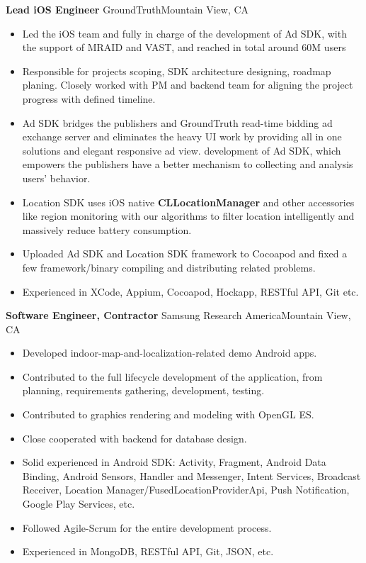\documentclass[10pt,letterpaper,sans]{moderncv}        %
\begin{document}
\vspace*{0.5cm}
{\textbf{Lead iOS Engineer}}
{GroundTruth}{Mountain View, CA}{}{
\begin{itemize}
\item Led the iOS team and fully in charge of the development of Ad SDK, with the support of MRAID and VAST, and reached in total around 60M users
\item Responsible for projects scoping, SDK architecture designing, roadmap planing. Closely worked with PM and backend team for aligning the project progress with defined timeline. 
\item Ad SDK bridges the publishers and GroundTruth read-time bidding ad exchange server and eliminates the heavy UI work by providing all in one solutions and elegant responsive ad view.
development of Ad SDK, which empowers the publishers have a better mechanism to collecting and analysis users' behavior.
\item Location SDK uses iOS native \textbf{CLLocationManager} and other accessories like region monitoring with our algorithms to filter location intelligently and massively reduce battery consumption.
\item Uploaded Ad SDK and Location SDK framework to Cocoapod and fixed a few framework/binary compiling and distributing related problems.
\item Experienced in XCode, Appium, Cocoapod, Hockapp, RESTful API, Git etc.
\end{itemize}} 

\vspace*{0.5cm}
{\textbf{Software Engineer, Contractor}}
{Samsung Research America}{Mountain View, CA}{}{
\begin{itemize}
\item Developed indoor-map-and-localization-related demo Android apps.
\item Contributed to the full lifecycle development of the application, from planning, requirements gathering, development, testing.
\item Contributed to graphics rendering and modeling with OpenGL ES.
\item Close cooperated with backend for database design.
\item Solid experienced in Android SDK: Activity, Fragment, Android Data Binding, Android Sensors, Handler and Messenger, Intent Services, Broadcast Receiver, Location Manager/FusedLocationProviderApi, Push Notification, Google Play Services, etc.
\item Followed Agile-Scrum for the entire development process.
\item Experienced in MongoDB, RESTful API, Git, JSON, etc.
\end{itemize}} 
\end{document}
